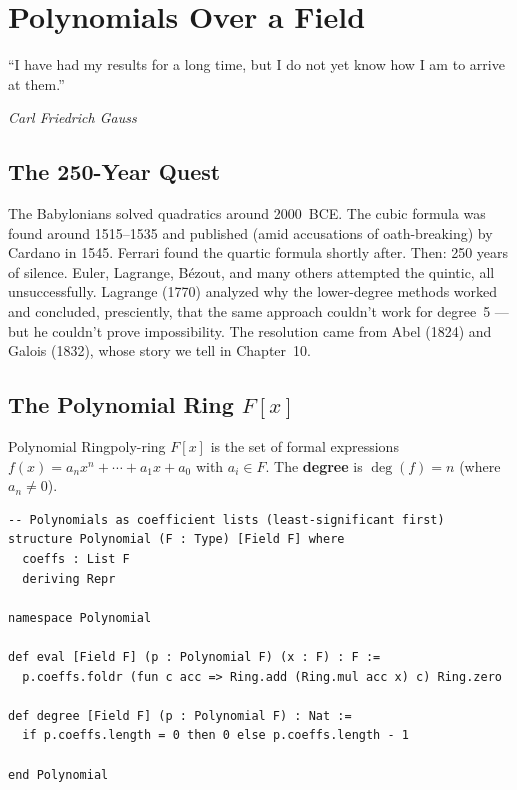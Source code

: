 \documentclass[11pt, a4paper, oneside]{book}
\renewcommand{\deg}{\operatorname{deg}}
\begin{document}
\chapter{Polynomials Over a Field}

\epigraph{``I have had my results for a long time, but I do not yet know how I
am to arrive at them.''}{\textit{Carl Friedrich Gauss}}

\section{The 250-Year Quest}

\begin{historical}[title={The Hunt for the Quintic Formula}]
The Babylonians solved quadratics around 2000~BCE. The cubic formula was found
around 1515--1535 and published (amid accusations of oath-breaking) by Cardano
in 1545. Ferrari found the quartic formula shortly after. Then: 250 years of
silence. Euler, Lagrange, Bézout, and many others attempted the quintic, all
unsuccessfully. Lagrange (1770) analyzed why the lower-degree methods worked
and concluded, presciently, that the same approach couldn't work for degree~5%
---but he couldn't prove impossibility. The resolution came from Abel (1824)
and Galois (1832), whose story we tell in Chapter~10.
\end{historical}

\section{The Polynomial Ring $F[x]$}

\begin{defn}{Polynomial Ring}{poly-ring}
$F[x]$ is the set of formal expressions
$f(x) = a_n x^n + \cdots + a_1 x + a_0$ with $a_i \in F$. The
\textbf{degree} is $\deg(f) = n$ (where $a_n \neq 0$).
\end{defn}

\begin{leanbox}
\begin{verbatim}
-- Polynomials as coefficient lists (least-significant first)
structure Polynomial (F : Type) [Field F] where
  coeffs : List F
  deriving Repr

namespace Polynomial

def eval [Field F] (p : Polynomial F) (x : F) : F :=
  p.coeffs.foldr (fun c acc => Ring.add (Ring.mul acc x) c) Ring.zero

def degree [Field F] (p : Polynomial F) : Nat :=
  if p.coeffs.length = 0 then 0 else p.coeffs.length - 1

end Polynomial
\end{verbatim}
\end{leanbox}
\end{document}
